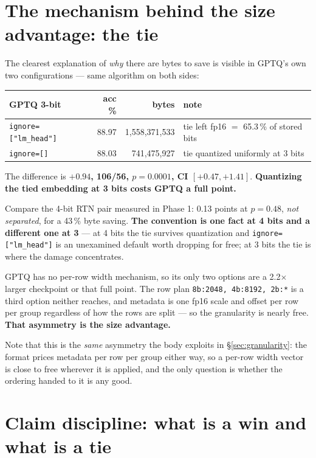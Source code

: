 \documentclass[11pt]{article}
\newcommand{\x}{\texorpdfstring{$\times$}{x}}
\newcommand{\pct}{\,\%}
\newcommand{\code}[1]{\texttt{#1}}
\newcommand{\best}[1]{\textbf{#1}}
\begin{document}
\section{The mechanism behind the size advantage: the tie}
\label{sec:tie}

The clearest explanation of \emph{why} there are bytes to save is visible in GPTQ's own two
configurations --- same algorithm on both sides:

\begin{center}\small
\begin{tabular}{@{}lrrl@{}}
\toprule
GPTQ 3-bit & acc \% & bytes & note \\
\midrule
\code{ignore=["lm\_head"]} & 88.97 & 1{,}558{,}371{,}533 & tie left fp16 $=$ 65.3\pct{} of stored bits \\
\code{ignore=[]} & 88.03 & 741{,}475{,}927 & tie quantized uniformly at 3 bits \\
\bottomrule
\end{tabular}
\end{center}

The difference is \best{$+0.94$, 106/56, $p = 0.0001$, CI $[+0.47, +1.41]$}. \textbf{Quantizing
the tied embedding at 3 bits costs GPTQ a full point.}

Compare the 4-bit RTN pair measured in Phase 1: 0.13 points at $p = 0.48$, \emph{not separated},
for a 43\pct{} byte saving. \textbf{The convention is one fact at 4 bits and a different one at
3} --- at 4 bits the tie survives quantization and \code{ignore=["lm\_head"]} is an unexamined
default worth dropping for free; at 3 bits the tie is where the damage concentrates.

GPTQ has no per-row width mechanism, so its only two options are a 2.2\x{} larger checkpoint or
that full point. The row plan \code{8b:2048, 4b:8192, 2b:*} is a third option neither reaches, and
metadata is one fp16 scale and offset per row per group regardless of how the rows are split ---
so the granularity is nearly free. \textbf{That asymmetry is the size advantage.}

Note that this is the \emph{same} asymmetry the body exploits in \S\ref{sec:granularity}: the
format prices metadata per row per group either way, so a per-row width vector is close to free
wherever it is applied, and the only question is whether the ordering handed to it is any good.

\section{Claim discipline: what is a win and what is a tie}
\label{sec:discipline}
\end{document}
